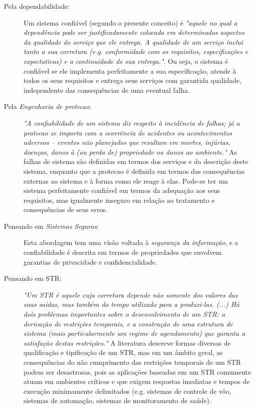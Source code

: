     \begin{description}
        \item[Pela \Gls{dependabilidade}:] Um sistema confiável 
        (segundo o presente conceito) é \emph{"aquele no qual a dependência 
        pode ser justificadamente colocada em determinados aspectos da 
        qualidade do serviço que ele entrega. A qualidade de um serviço inclui 
        tanto a sua corretura (e.g. conformidade com os requisitos, 
        especificações e expectativas) e a continuidade de sua entrega."}. Ou 
        seja, o sistema é confiável se ele implementa perfeitamente a sua 
        especificação, atende à todos os seus requisitos e entrega seus 
        serviços com garantida qualidade, independente das consequências de uma 
        eventual falha.
    
        \item[Pela \emph{Engenharia de \Gls{protecao}}:] \emph{"A 
        confiabilidade de um sistema diz respeito à incidência de falhas; já a 
        \gls{protecao} se importa com a ocorrência de acidentes ou 
        acontecimentos adversos -- eventos não planejados que resultam em 
        mortes, injúrias, doenças, danos à (ou perda de) propriedade ou danos 
        ao ambiente."} As falhas de sistema são definidas em termos dos 
        serviços e da descrição deste sistema, enquanto que a \gls{protecao} é 
        definida em termos das consequências externas ao sistema e à forma como 
        ele reage à elas. Pode-se ter um sistema perfeitamente confiável em 
        termos da adequação aos seus requisitos, mas igualmente inseguro em 
        relação ao tratamento e consequências de seus erros.
        
        \item[Pensando em \emph{Sistemas Seguros}:] Esta abordagem tem
        uma visão voltada à \emph{segurança da informação}, e a confiabilidade 
        é descrita em termos de propriedades que envolvem garantias de 
        privacidade e confidencialidade.
        
        \item[Pensando em \gls{STR}:] \emph{"Um \gls{STR} é aquele cuja 
        corretura depende não somente dos valores das suas saídas, mas também 
        do tempo utilizado para a produzi-las. (...) Há dois problemas 
        importantes sobre o desenvolvimento de um \gls{STR}: a derivação de 
        restrições temporais, e a construção de uma estrutura de sistema (mais 
        particularmente um regime de agendamento) que garanta a satisfação 
        destas restrições."} A literatura descreve formas diversas de 
        qualificação e tipificação de um \gls{STR}, mas em um âmbito geral, as 
        consequências do não cumprimento das restrições temporais de um 
        \gls{STR} podem ser desastrosas, pois as aplicações baseadas em um 
        \gls{STR} comumente atuam em ambientes críticos e que exigem respostas 
        imediatas e tempos de execução minimamente delimitados (e.g. sistemas 
        de controle de vôo, sistemas de automação, sistemas de monitoramento de 
        saúde).
    \end{description}
    
